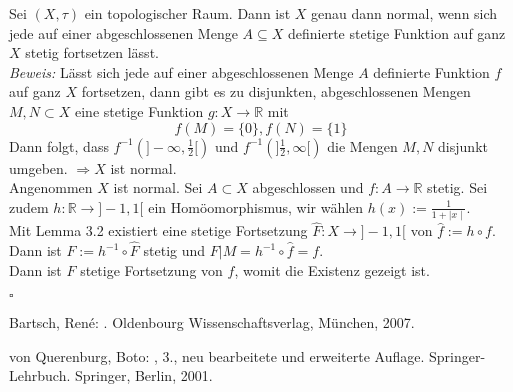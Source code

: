 \documentclass[11pt,leqno]{article}
\newcommand{\R}{\mathbb{R}}
\begin{document}
Sei $(X,\tau)$ ein topologischer Raum. Dann ist $X$ genau dann normal, wenn sich jede auf einer abgeschlossenen Menge $A\subseteq X$ definierte
stetige Funktion auf ganz $X$ stetig fortsetzen lässt. \\
\textit{Beweis:} Lässt sich jede auf einer abgeschlossenen Menge $A$ definierte Funktion $f$ auf ganz $X$ fortsetzen, dann gibt es zu disjunkten,
abgeschlossenen Mengen $M, N \subset X$ eine stetige Funktion $g:X \rightarrow \R$ mit 
\[f(M)= \{0\}, f(N)= \{1\} \]
Dann folgt, dass $f^{-1}(]-\infty, \frac{1}{2}[)$ und $f^{-1}(]\frac{1}{2}, \infty[)$ die Mengen $M,N$ disjunkt umgeben.
$\Rightarrow X$ ist normal.\\
Angenommen $X$ ist normal. Sei $A \subset X$ abgeschlossen und $f:A \rightarrow \R$ stetig.
Sei zudem $h:\R \rightarrow ]-1,1[$ ein Homöomorphismus, wir wählen $h(x):=\frac{1}{1+\mid x \mid}$. \\
Mit Lemma 3.2 existiert eine stetige Fortsetzung $\hat{F}:X\rightarrow]-1,1[$ von $\hat{f}:=h \circ f$.\\
Dann ist $F:=h^{-1} \circ \hat{F}$ stetig und $F\big\vert M = h^{-1}\circ \hat{f}=f$.\\
Dann ist $F$ stetige Fortsetzung von $f$, womit die Existenz gezeigt ist. 
\begin{flushright}
    $\square$
\end{flushright}

\begin{thebibliography}{99}

    {\sc Bartsch, René:}
    .
    \newblock Oldenbourg Wissenschaftsverlag, München, 2007.
    
    
    {\sc von Querenburg, Boto:}
    , 3., neu bearbeitete und erweiterte Auflage.
    \newblock Springer-Lehrbuch. Springer, Berlin, 2001.
\end{thebibliography}
\end{document}
